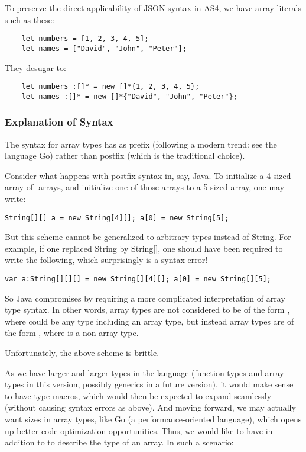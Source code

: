 To preserve the direct applicability of JSON syntax in AS4, we have array
literals such as these:
\begin{verbatim}
    let numbers = [1, 2, 3, 4, 5];
    let names = ["David", "John", "Peter"];
\end{verbatim}
They desugar to:
\begin{verbatim}
    let numbers :[]* = new []*{1, 2, 3, 4, 5};
    let names :[]* = new []*{"David", "John", "Peter"};
\end{verbatim}

\subsubsection{Explanation of Syntax}

The syntax for array types has \code{[]} as prefix (following a modern
trend: see the language Go) rather than postfix (which is
the traditional choice).

Consider what happens with postfix syntax in, say, Java. To initialize
a 4-sized array of -arrays, and initialize one of those arrays
to a 5-sized  array, one may write:

\begin{verbatim}
String[][] a = new String[4][]; a[0] = new String[5];
\end{verbatim}

But this scheme cannot be generalized to arbitrary types instead of
String. For example, if one replaced String by String[], one should
have been required to write the following, which surprisingly is a syntax error!

\begin{verbatim}
var a:String[][][] = new String[][4][]; a[0] = new String[][5];
\end{verbatim}

So Java compromises by requiring a
more complicated interpretation of array type syntax. In other words,
array types are not considered to be of the form , where
 could be any type including an array type, but instead array
types are of the form , where  is a non-array type.

Unfortunately, the above scheme is brittle.

As we have larger and larger types in the language (function types and
array types in this version, possibly generics in a future version),
it would make sense to have type macros, which would then be expected
to expand seamlessly (without causing syntax errors as above). And moving forward, we may
actually want sizes in array types, like Go (a performance-oriented
language), which opens up better code optimization
opportunities. Thus, we would like to have  in addition
to  to describe the type of an array. In such a scenario:

